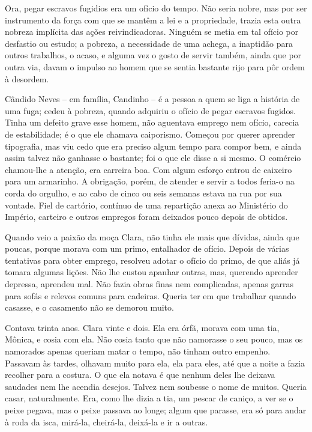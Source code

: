 Ora, pegar escravos fugidios era um ofício do tempo. Não seria nobre,
mas por ser instrumento da força com que se mantêm a lei e a
propriedade, trazia esta outra nobreza implícita das ações
reivindicadoras. Ninguém se metia em tal ofício por desfastio ou estudo;
a pobreza, a necessidade de uma achega, a inaptidão para outros
trabalhos, o acaso, e alguma vez o gosto de servir também, ainda que por
outra via, davam o impulso ao homem que se sentia bastante rijo para pôr
ordem à desordem.

Cândido Neves -- em família, Candinho -- é a pessoa a quem se liga a
história de uma fuga; cedeu à pobreza, quando adquiriu o ofício de pegar
escravos fugidos. Tinha um defeito grave esse homem, não aguentava
emprego nem ofício, carecia de estabilidade; é o que ele chamava
caiporismo. Começou por querer aprender tipografia, mas viu cedo que era
preciso algum tempo para compor bem, e ainda assim talvez não ganhasse o
bastante; foi o que ele disse a si mesmo. O comércio chamou-lhe a
atenção, era carreira boa. Com algum esforço entrou de caixeiro para um
armarinho. A obrigação, porém, de atender e servir a todos feria-o na
corda do orgulho, e ao cabo de cinco ou seis semanas estava na rua por
sua vontade. Fiel de cartório, contínuo de uma repartição anexa ao
Ministério do Império, carteiro e outros empregos foram deixados pouco
depois de obtidos.

Quando veio a paixão da moça Clara, não tinha ele mais que dívidas,
ainda que poucas, porque morava com um primo, entalhador de ofício.
Depois de várias tentativas para obter emprego, resolveu adotar o ofício
do primo, de que aliás já tomara algumas lições. Não lhe custou apanhar
outras, mas, querendo aprender depressa, aprendeu mal. Não fazia obras
finas nem complicadas, apenas garras para sofás e relevos comuns para
cadeiras. Queria ter em que trabalhar quando casasse, e o casamento não
se demorou muito.

Contava trinta anos. Clara vinte e dois. Ela era órfã, morava com uma
tia, Mônica, e cosia com ela. Não cosia tanto que não namorasse o seu
pouco, mas os namorados apenas queriam matar o tempo, não tinham outro
empenho. Passavam às tardes, olhavam muito para ela, ela para eles, até
que a noite a fazia recolher para a costura. O que ela notava é que
nenhum deles lhe deixava saudades nem lhe acendia desejos. Talvez nem
soubesse o nome de muitos. Queria casar, naturalmente. Era, como lhe
dizia a tia, um pescar de caniço, a ver se o peixe pegava, mas o peixe
passava ao longe; algum que parasse, era só para andar à roda da isca,
mirá-la, cheirá-la, deixá-la e ir a outras.

